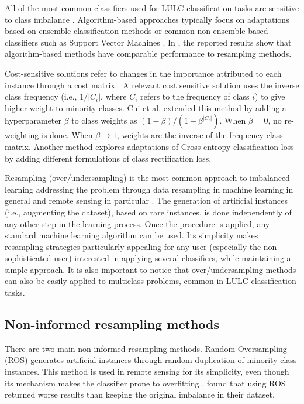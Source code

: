\documentclass[preprint,12pt]{elsarticle}
\begin{document}
All of the most common classifiers used for LULC classification tasks
\cite{Khatami2016, Gavade2019} are sensitive to class imbalance
\cite{Blagus2010}. Algorithm-based approaches typically focus on adaptations
based on ensemble classification methods \cite{Mellor2015} or common
non-ensemble based classifiers such as Support Vector Machines \cite{Shao2014}.
In \cite{Lee2016}, the reported results show that algorithm-based methods have
comparable performance to resampling methods.

Cost-sensitive solutions refer to changes in the importance attributed to each
instance through a cost matrix \cite{Huang2016,Cui2019,Dong2017}. A
relevant cost sensitive solution
\cite{Huang2016} uses  the inverse class frequency (i.e., $1/|C_i|$, where $C_i$ refers
to the frequency of class $i$) to give higher weight to
minority classes. Cui et al. \cite{Cui2019} extended this method by adding a
hyperparameter $\beta$ to class weights as $(1-\beta)/(1-\beta^{|C_i|})$. When
$\beta=0$, no re-weighting is done. When $\beta\rightarrow 1$, weights are the
inverse of the frequency class matrix. Another method \cite{Dong2017} explores
adaptations of Cross-entropy classification loss by adding different
formulations of class rectification loss.

Resampling (over/undersampling) is the most common approach to imbalanced
learning addressing the problem through data resampling in machine learning in
general and remote sensing in particular \cite{Feng2019}. The generation of
artificial instances (i.e., augmenting the dataset), based on rare instances,
is done independently of any other step in the learning process. Once the
procedure is applied, any standard machine learning algorithm can be used. Its
simplicity makes resampling strategies particularly appealing for any user
(especially the non-sophisticated user) interested in applying several
classifiers, while maintaining a simple approach.  It is also important to
notice that over/undersampling methods can also be easily applied to
multiclass problems, common in LULC classification tasks.

\subsection{Non-informed resampling methods}

There are two main non-informed resampling methods. Random Oversampling (ROS)
generates artificial instances through random duplication of minority class
instances. This method is used in remote sensing \cite{Sharififar2019,
Hounkpatin2018} for its simplicity, even though its mechanism makes the
classifier prone to overfitting \cite{Krawczyk2016}. \cite{Hounkpatin2018}
found that using ROS returned worse results than keeping the original
imbalance in their dataset.
\end{document}
